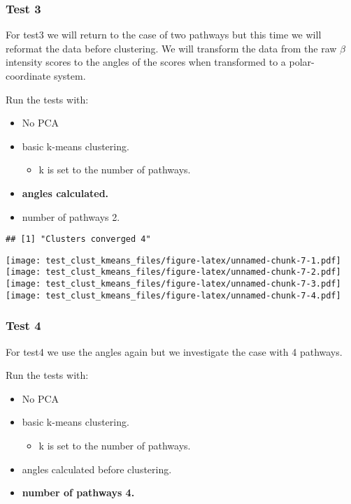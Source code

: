 \documentclass[
]{article}
\providecommand{\tightlist}{%
  \setlength{\itemsep}{0pt}\setlength{\parskip}{0pt}}
\begin{document}
\hypertarget{test3}{%
\subsubsection{Test 3}\label{test3}}

For test3 we will return to the case of two pathways but this time we
will reformat the data before clustering. We will transform the data
from the raw \(\beta\) intensity scores to the angles of the scores when
transformed to a polar-coordinate system.

Run the tests with:

\begin{itemize}
\tightlist
\item
  No PCA
\item
  basic k-means clustering.

  \begin{itemize}
  \tightlist
  \item
    k is set to the number of pathways.
  \end{itemize}
\item
  \textbf{angles calculated.}
\item
  number of pathways 2.
\end{itemize}

\begin{verbatim}
## [1] "Clusters converged 4"
\end{verbatim}

\texttt{[image: test\_clust\_kmeans\_files/figure-latex/unnamed-chunk-7-1.pdf]}
\texttt{[image: test\_clust\_kmeans\_files/figure-latex/unnamed-chunk-7-2.pdf]}
\texttt{[image: test\_clust\_kmeans\_files/figure-latex/unnamed-chunk-7-3.pdf]}
\texttt{[image: test\_clust\_kmeans\_files/figure-latex/unnamed-chunk-7-4.pdf]}

\hypertarget{test4}{%
\subsubsection{Test 4}\label{test4}}

For test4 we use the angles again but we investigate the case with 4
pathways.

Run the tests with:

\begin{itemize}
\tightlist
\item
  No PCA
\item
  basic k-means clustering.

  \begin{itemize}
  \tightlist
  \item
    k is set to the number of pathways.
  \end{itemize}
\item
  angles calculated before clustering.
\item
  \textbf{number of pathways 4.}
\end{itemize}
\end{document}

